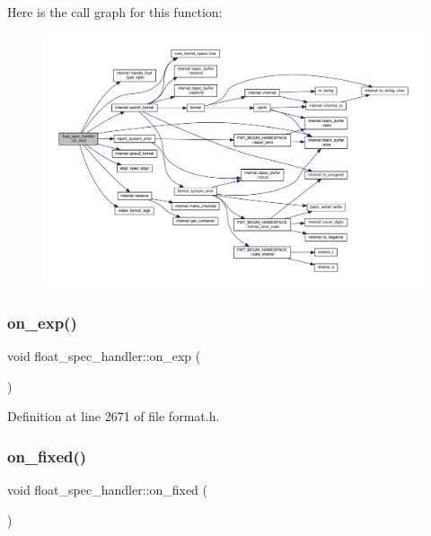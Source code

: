 Here is the call graph for this function\+:
\nopagebreak
\begin{figure}[H]
\begin{center}
\leavevmode
\includegraphics[width=350pt]{structfloat__spec__handler_ae7ee9d59f1624b0cc52fe767a5ef96bf_cgraph}
\end{center}
\end{figure}
\mbox{\label{structfloat__spec__handler_aaee6f6903f2c45237cc8d5aba15582a3}} 
\subsubsection{\texorpdfstring{on\+\_\+exp()}{on\_exp()}}
{\footnotesize\ttfamily void float\+\_\+spec\+\_\+handler\+::on\+\_\+exp (\begin{DoxyParamCaption}{ }\end{DoxyParamCaption})\hspace{0.3cm}{\ttfamily [inline]}}



Definition at line 2671 of file format.\+h.

\mbox{\label{structfloat__spec__handler_a439e537fbd78405b834e778601738953}} 
\subsubsection{\texorpdfstring{on\+\_\+fixed()}{on\_fixed()}}
{\footnotesize\ttfamily void float\+\_\+spec\+\_\+handler\+::on\+\_\+fixed (\begin{DoxyParamCaption}{ }\end{DoxyParamCaption})\hspace{0.3cm}{\ttfamily [inline]}}



